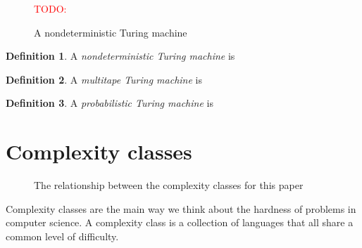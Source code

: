 \documentclass[english,12pt]{reedthesis}
\theoremstyle{plain}
\theoremstyle{definition}
\newtheorem{defn}[defn]{Definition}
\theoremstyle{remark}
\newcommand{\TODO}[1]{\textcolor{red}{TODO: #1}}
\begin{document}
\begin{figure}[htbp]
  \centering
  \TODO{}
  \begin{tikzpicture}
  \end{tikzpicture}
  \caption{A nondeterministic Turing machine}\label{fig:ntm}
\end{figure}

\begin{defn}\label{def:nondeterministic-tm}
  A \emph{nondeterministic Turing machine} is %
\end{defn}

\begin{defn}\label{def:multitape-tm}
  A \emph{multitape Turing machine} is
\end{defn}

\begin{defn}\label{def:prob-tm}
  A \emph{probabilistic Turing machine} is
\end{defn}

\section{Complexity classes}


\begin{figure}[htbp]
  \centering
  \caption{The relationship between the complexity classes for this
    paper}\label{fig:comp-class}
\end{figure}

Complexity classes are the main way we think about the hardness of problems in
computer science. A complexity class is a collection of
languages that all share a common level of difficulty.
\end{document}
